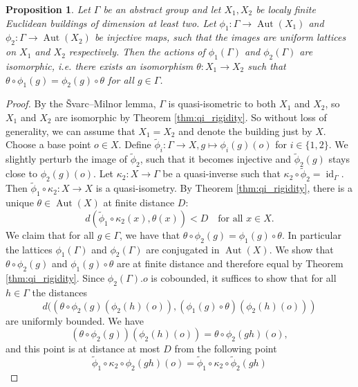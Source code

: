 \documentclass[10pt,a4paper]{amsart}
\newtheorem{proposition}{Proposition}
\DeclareMathOperator{\Aut}{Aut}
\DeclareMathOperator{\id}{id}
\begin{document}
    \begin{proposition}\label{prop:action_rigidity}
        Let $\Gamma$ be an abstract group and let $X_1,X_2$ be localy finite Euclidean buildings of dimension at least two.
        Let $\phi_1 : \Gamma \to \Aut(X_1)$ and $\phi_2 : \Gamma \to \Aut(X_2)$ be injective maps, such that the images are uniform lattices on $X_1$ and $X_2$ respectively. Then the actions of $\phi_1(\Gamma)$ and $\phi_2(\Gamma)$ are isomorphic, i.e. there exists an isomorphism $\theta: X_1\to X_2$ such that $\theta \circ \phi_1(g) = \phi_2(g)\circ \theta$ for all $g \in \Gamma$.
    \end{proposition}

    \begin{proof}
        By the \v{S}varc--Milnor lemma, $\Gamma$ is quasi-isometric to both $X_1$ and $X_2$, so $X_1$ and $X_2$ are isomorphic by Theorem \ref{thm:qi_rigidity}. 
        So without loss of generality, we can assume that $X_1=X_2$ and denote the building just by $X$.
        Choose a base point $o \in X$. Define $\tilde \phi_i : \Gamma \to X, g \mapsto \phi_i(g)(o)$ for $i \in \{1,2\}$.
        We slightly perturb the image of $\tilde \phi_2$, such that it becomes injective and $\tilde \phi_2(g)$ stays close to $\phi_2(g)(o)$.
        Let $\kappa_2 : X\to \Gamma$ be a quasi-inverse such that $\kappa_2 \circ \tilde \phi_2 = \id_\Gamma$.
        Then $\tilde \phi_1 \circ \kappa_2 : X \to X$ is a quasi-isometry. By Theorem \ref{thm:qi_rigidity}, there is a unique $\theta\in\Aut(X)$ at finite distance $D$:
        \[
            d(\tilde \phi_1 \circ \kappa_2(x), \theta(x)) < D \quad \text{for all } x\in X.
        \]
        We claim that for all $g \in \Gamma$, we have that $\theta \circ \phi_2(g) = \phi_1(g) \circ\theta$. In particular the lattices $\phi_1(\Gamma)$ and $\phi_2(\Gamma)$ are conjugated in $\Aut(X)$.
        We show that $\theta \circ \phi_2(g)$ and $\phi_1(g) \circ \theta$ are at finite distance and therefore equal by Theorem \ref{thm:qi_rigidity}.
        Since $\phi_2(\Gamma).o$ is cobounded, it suffices to show that for all $h \in \Gamma$ the distances
        \[
            d((\theta \circ \phi_2(g)(\phi_2(h)(o)), (\phi_1(g)\circ \theta)(\phi_2(h)(o)))
        \]
        are uniformly bounded.
        We have 
        \[
            (\theta \circ \phi_2(g))(\phi_2(h)(o)) = \theta \circ \phi_2(gh)(o),
        \]
        and this point is at distance at most $D$ from the following point
        \[
            \tilde \phi_1 \circ \kappa_2 \circ \phi_2(gh)(o)
            = \tilde \phi_1\circ \kappa_2 \circ \tilde \phi_2(gh) 
\]
\end{proof}
\end{document}
